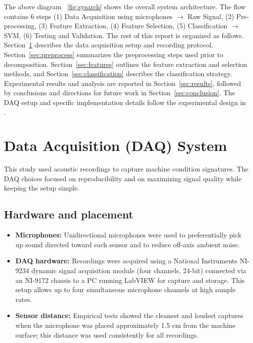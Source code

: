 \documentclass[12pt,a4paper]{article}
\begin{document}
\begin{multicols}{2}

The above diagram ~\ref{fig:sysarch} shows the overall system architecture. The flow contains 6 steps (1) Data Acquisition using microphones $\rightarrow$ Raw Signal, (2) Pre-processing, (3) Feature Extraction, (4) Feature Selection, (5) Classification $\rightarrow$ SVM, (6) Testing and Validation.
The rest of this report is organized as follows. Section~\ref{sec:daq} describes the data acquisition setup and recording protocol. Section~\ref{sec:preprocess} summarizes the preprocessing steps used prior to decomposition. Section~\ref{sec:features} outlines the feature extraction and selection methods, and Section~\ref{sec:classification} describes the classification strategy. Experimental results and analysis are reported in Section~\ref{sec:results}, followed by conclusions and directions for future work in Section~\ref{sec:conclusion}. The DAQ setup and specific implementation details follow the experimental design in \cite{Verma2016}.

\section{Data Acquisition (DAQ) System}
\label{sec:daq}

This study used acoustic recordings to capture machine condition signatures. The DAQ choices focused on reproducibility and on maximizing signal quality while keeping the setup simple.

\subsection{Hardware and placement}
\begin{itemize}
  \item \textbf{Microphones:} Unidirectional microphones were used to preferentially pick up sound directed toward each sensor and to reduce off-axis ambient noise.
  \item \textbf{DAQ hardware:} Recordings were acquired using a National Instruments NI-9234 dynamic signal acquisition module (four channels, 24-bit) connected via an NI-9172 chassis to a PC running LabVIEW for capture and storage. This setup allows up to four simultaneous microphone channels at high sample rates.
  \item \textbf{Sensor distance:} Empirical tests showed the cleanest and loudest captures when the microphone was placed approximately 1.5 cm from the machine surface; this distance was used consistently for all recordings.
\end{itemize}

\end{multicols}
\end{document}
